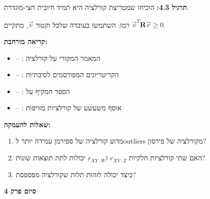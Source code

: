 \textbf{תרגיל \num{4.3}:} הוכיחו שמטריצת קורלציה היא תמיד חיובית חצי-מוגדרת.

רמז: השתמשו בעובדה שלכל וקטור $\vec{v}$, מתקיים $\vec{v}^T \mathbf{R} \vec{v} \geq 0$.

\textbf{קריאה מורחבת:}

\begin{itemize}
\item \cite{pearson1896} – : המאמר המקורי על קורלציה
\item \cite{hill1965} – : הקריטריונים המפורסמים לסיבתיות
\item \cite{pearl2009} – : הספר המקיף על 
\item \cite{vigen2015} – : אוסף משעשע של קורלציות מזויפות
\end{itemize}

\textbf{שאלות להעמקה:}

\begin{enumerate}
\item מדוע קורלציה של ספירמן עמידה יותר ל\en{-}outliers מקורלציה של פירסון?
\item האם שתי קורלציות חלקיות $r_{XY \cdot Z}$ ו\en{-}$r_{XY \cdot W}$ יכולות לתת תוצאות שונות?
\item כיצד  יכולה לזהות תלות שקורלציה מפספסת?
\end{enumerate}

\textbf{סיום פרק \num{4}}
